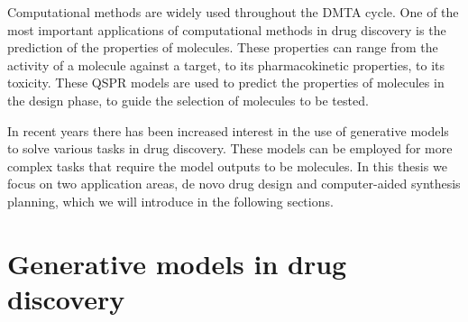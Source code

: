 Computational methods are widely used throughout the DMTA cycle. One of the most important
applications of computational methods in drug discovery is the prediction of the properties of
molecules. These properties can range from the activity of a molecule against a target, to its
pharmacokinetic properties, to its toxicity. These \ac{QSPR} models are used to predict the
properties of molecules in the design phase, to guide the selection of molecules to be tested.

In recent years there has been increased interest in the use of generative models to solve various
tasks in drug discovery. These models can be employed for more complex tasks that require the model
outputs to be molecules. In this thesis we focus on two application areas, de novo drug design and
computer-aided synthesis planning, which we will introduce in the following sections.

\section{Generative models in drug discovery}
